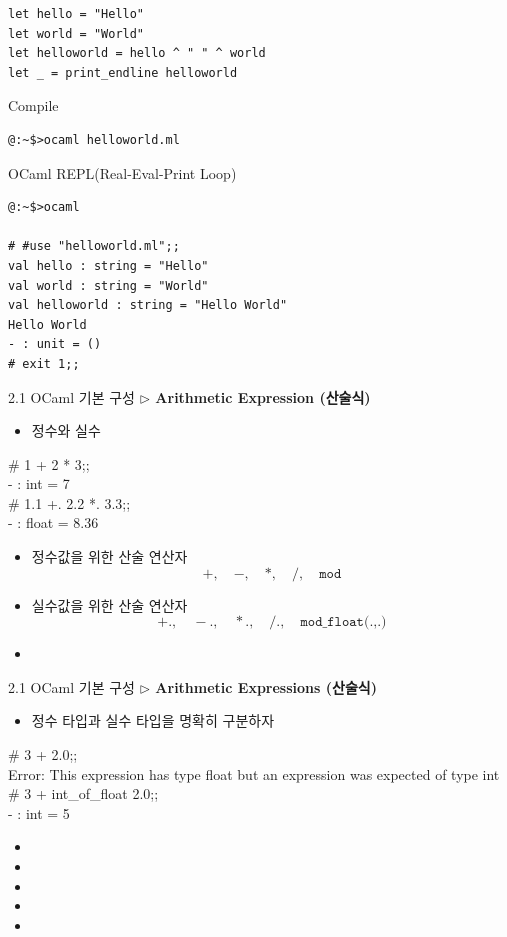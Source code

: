 \documentclass[10pt]{beamer}
\begin{document}
\begin{lstlisting}[style=ocaml]
let hello = "Hello"
let world = "World"
let helloworld = hello ^ " " ^ world
let _ = print_endline helloworld
\end{lstlisting}

Compile
\begin{lstlisting}[style=zsh]
@:~$>ocaml helloworld.ml
\end{lstlisting}

OCaml REPL(Real-Eval-Print Loop)
\begin{lstlisting}[style=zsh]
@:~$>ocaml

# #use "helloworld.ml";;
val hello : string = "Hello"
val world : string = "World"
val helloworld : string = "Hello World"
Hello World
- : unit = ()
# exit 1;;
\end{lstlisting}
	\newpage
	\begin{frame}{2.1 OCaml 기본 구성}
		\textbf{$\triangleright$ Arithmetic Expression (산술식)}
		
		\begin{itemize}
			\item 정수와 실수
		\end{itemize}
		\begin{tcolorbox}[colback=backcolor]\ttfamily
			\# 1 + 2 * 3;;\\
			- : int = 7\\
			\# 1.1 +. 2.2 *. 3.3;;\\
			- : float = 8.36
		\end{tcolorbox}
		\begin{itemize}
			\item[] 정수값을 위한 산술 연산자 \[
			+,\quad -,\quad*,\quad/,\quad\texttt{mod}
			\]
			\item[] 실수값을 위한 산술 연산자 \[
			+.,\quad -.,\quad*.,\quad/.,\quad\texttt{mod\_float(.,.)}
			\]
			\item[]
		\end{itemize}
	\end{frame}

	\begin{frame}{2.1 OCaml 기본 구성}
		\textbf{$\triangleright$ Arithmetic Expressions (산술식)}
		
		\begin{itemize}
			\item 정수 타입과 실수 타입을 명확히 구분하자
		\end{itemize}
		 \begin{tcolorbox}[colback=backcolor]\ttfamily
			\# 3 + 2.0;; \\
			Error: This expression has type float but an expression was expected of type
			int\\
			\# 3 + int\_of\_float 2.0;;\\
			- : int = 5
		\end{tcolorbox}	
		\begin{itemize}
			\item[] 
			\item[] 
			\item[] 
			\item[] 
			\item[] 
		\end{itemize}
	\end{frame}
\end{document}
